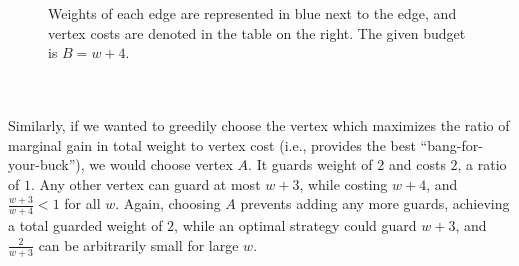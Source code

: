 \begin{figure}
    \centering
    \caption{Weights of each edge are represented in blue next to the edge, and vertex costs are denoted in the table on the right. The given budget is $B=w+4$.}
    \label{fig:greedy-cheapest}
\end{figure}\\\\
Similarly, if we wanted to greedily choose the vertex which maximizes the ratio of marginal gain in total weight to vertex cost (i.e., provides the best ``bang-for-your-buck''), we would choose vertex $A$. It guards weight of $2$ and costs $2$, a ratio of $1$. Any other vertex can guard at most $w+3$, while costing $w+4$, and $\frac{w+3}{w+4}<1$ for all $w$. Again, choosing $A$ prevents adding any more guards, achieving a total guarded weight of $2$, while an optimal strategy could guard $w+3$, and $\frac{2}{w+3}$ can be arbitrarily small for large $w$. \\\\
